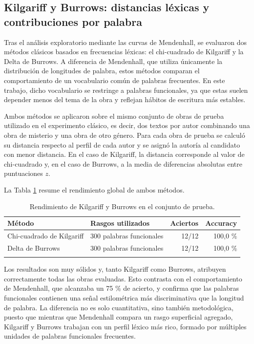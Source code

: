 \documentclass[IB]{TFUOC}%
\begin{document}
\subsection{Kilgariff y Burrows: distancias léxicas y contribuciones por palabra}

Tras el análisis exploratorio mediante las curvas de Mendenhall, se evaluaron dos métodos clásicos basados en frecuencias léxicas: el chi-cuadrado de Kilgariff y la Delta de Burrows. A diferencia de Mendenhall, que utiliza únicamente la distribución de longitudes de palabra, estos métodos comparan el comportamiento de un vocabulario común de palabras frecuentes. En este trabajo, dicho vocabulario se restringe a palabras funcionales, ya que estas suelen depender menos del tema de la obra y reflejan hábitos de escritura más estables.

Ambos métodos se aplicaron sobre el mismo conjunto de obras de prueba utilizado en el experimento clásico, es decir, dos textos por autor combinando una obra de misterio y una obra de otro género. Para cada obra de prueba se calculó su distancia respecto al perfil de cada autor y se asignó la autoría al candidato con menor distancia. En el caso de Kilgariff, la distancia corresponde al valor de chi-cuadrado y, en el caso de Burrows, a la media de diferencias absolutas entre puntuaciones $z$.

La Tabla \ref{tab:kilgariff-burrows-resultados} resume el rendimiento global de ambos métodos.

\begin{longtable}{|p{4.6cm}|p{4.5cm}|r|r|}
\hline
\textbf{Método} & \textbf{Rasgos utilizados} & \textbf{Aciertos} & \textbf{Accuracy} \\
\hline
Chi-cuadrado de Kilgariff & 300 palabras funcionales & 12/12 & 100,0 \% \\
\hline
Delta de Burrows & 300 palabras funcionales & 12/12 & 100,0 \% \\
\hline
\caption{Rendimiento de Kilgariff y Burrows en el conjunto de prueba.}
\label{tab:kilgariff-burrows-resultados}
\end{longtable}

Los resultados son muy sólidos y, tanto Kilgariff como Burrows, atribuyen correctamente todas las obras evaluadas. Esto contrasta con el comportamiento de Mendenhall, que alcanzaba un 75 \% de acierto, y confirma que las palabras funcionales contienen una señal estilométrica más discriminativa que la longitud de palabra. La diferencia no es solo cuantitativa, sino también metodológica, puesto que mientras que Mendenhall compara un rasgo superficial agregado, Kilgariff y Burrows trabajan con un perfil léxico más rico, formado por múltiples unidades de palabras funcionales frecuentes.
\end{document}
